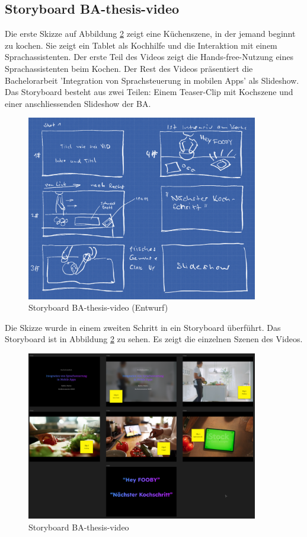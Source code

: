 \documentclass[main.tex]{subfiles} %
\begin{document}
\subsection{Storyboard BA-thesis-video}
Die erste Skizze auf Abbildung \ref{fig:storyboard} zeigt eine Küchenszene, in der jemand beginnt 
zu kochen. Sie zeigt ein Tablet als Kochhilfe und die Interaktion mit einem Sprachassistenten. 
Der erste Teil des Videos zeigt die Hands-free-Nutzung eines Sprachassistenten beim Kochen. 
Der Rest des Videos präsentiert die Bachelorarbeit 'Integration von Sprachsteuerung in mobilen Apps' 
als Slideshow. Das Storyboard besteht aus zwei Teilen: Einem Teaser-Clip mit Kochszene und einer 
anschliessenden Slideshow der BA.

\begin{figure}[h]
    \centering
    \includegraphics[width=0.9\textwidth]{img/storyboard-draft.png}
    \caption{Storyboard BA-thesis-video (Entwurf)}
    \label{fig:storyboard-draft}
\end{figure}

\newpage
\noindent \newline
Die Skizze wurde in einem zweiten Schritt in ein Storyboard überführt. Das Storyboard ist in 
Abbildung \ref{fig:storyboard} zu sehen. Es zeigt die einzelnen Szenen des Videos.

\begin{figure}[h]
    \centering
    \includegraphics[width=0.9\textwidth]{img/storyboard.png}
    \caption{Storyboard BA-thesis-video}
    \label{fig:storyboard}
\end{figure}
\end{document}
